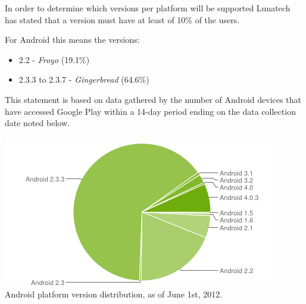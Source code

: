 







In order to determine which versions per platform will be supported Lunatech has stated that a version must have at least of 10\% of the users. 

\noindent For Android this means the versions:
\begin{itemize}
\item 2.2 - \emph{Froyo} (19.1\%)
\item 2.3.3 to 2.3.7 - \emph{Gingerbread} (64.6\%)
\end{itemize}
This statement is based on data gathered by the number of Android devices that have accessed Google Play within a 14-day period ending on the data collection date noted below.
\begin{centering}
\includegraphics[scale=0.35]{images/androidversionchart.png}\\{Android platform version distribution, as of June 1st, 2012.\cite{GoogleAndroid2012}}\\
\end{centering}

